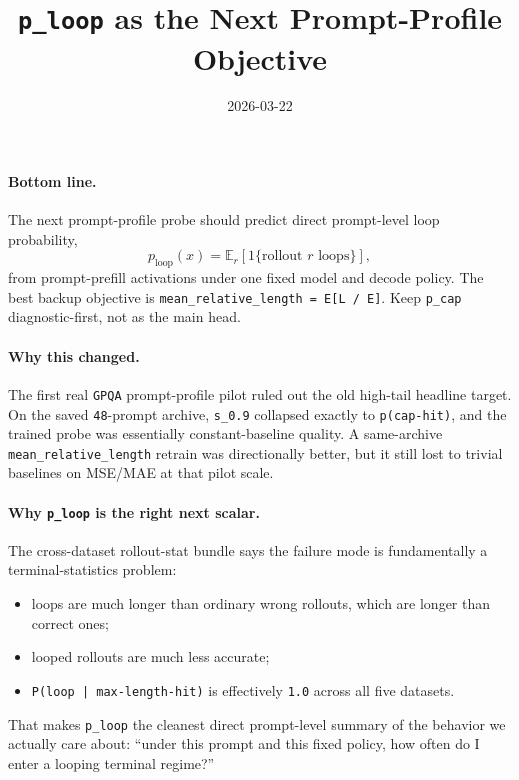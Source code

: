 \documentclass[11pt]{article}
\title{\texttt{p\_loop} as the Next Prompt-Profile Objective}
\author{}
\date{2026-03-22}
\begin{document}
\maketitle

\paragraph{Bottom line.}
The next prompt-profile probe should predict direct prompt-level loop probability,
\[
p_{\mathrm{loop}}(x) = \mathbb{E}_r \left[ 1\{\text{rollout } r \text{ loops}\} \right],
\]
from prompt-prefill activations under one fixed model and decode policy. The best
backup objective is \texttt{mean\_relative\_length = E[L / E]}. Keep
\texttt{p\_cap} diagnostic-first, not as the main head.

\paragraph{Why this changed.}
The first real \texttt{GPQA} prompt-profile pilot ruled out the old high-tail
headline target. On the saved \texttt{48}-prompt archive,
\texttt{s\_0.9} collapsed exactly to \texttt{p(cap-hit)}, and
the trained probe was essentially constant-baseline quality. A same-archive
\texttt{mean\_relative\_length} retrain was directionally better, but it still
lost to trivial baselines on MSE/MAE at that pilot scale.

\paragraph{Why \texttt{p\_loop} is the right next scalar.}
The cross-dataset rollout-stat bundle says the failure mode is fundamentally a
terminal-statistics problem:
\begin{itemize}[leftmargin=1.5em]
\item loops are much longer than ordinary wrong rollouts, which are longer than correct ones;
\item looped rollouts are much less accurate;
\item \texttt{P(loop | max-length-hit)} is effectively \texttt{1.0} across all five datasets.
\end{itemize}
That makes \texttt{p\_loop} the cleanest direct prompt-level summary of the
behavior we actually care about: ``under this prompt and this fixed policy, how
often do I enter a looping terminal regime?''
\end{document}
